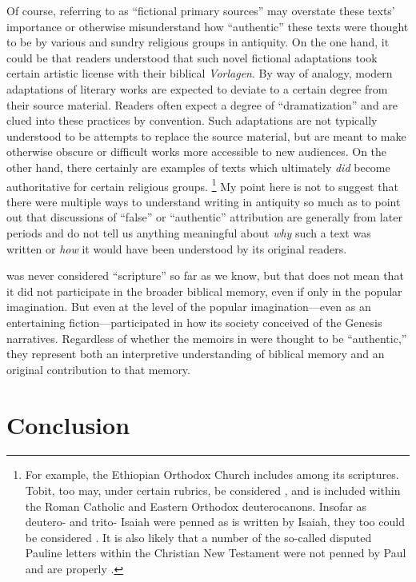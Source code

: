 Of course, referring to \psy as ``fictional primary sources'' may overstate these texts' importance or otherwise misunderstand how ``authentic'' these texts were thought to be by various and sundry religious groups in antiquity. On the one hand, it could be that readers understood that such novel fictional adaptations took certain artistic license with their biblical \emph{Vorlagen}. By way of analogy, modern adaptations of literary works are expected to deviate to a certain degree from their source material. Readers often expect a degree of ``dramatization'' and are clued into these practices by convention. Such adaptations are not typically understood to be attempts to replace the source material, but are meant to make otherwise obscure or difficult works more accessible to new audiences. On the other hand, there certainly are examples of \psgraphical texts which ultimately \emph{did} become authoritative for certain religious groups.%
    \footnote{For example, the Ethiopian Orthodox Church includes \firstenoch among its scriptures. Tobit, too may, under certain rubrics, be considered \psa, and is included within the Roman Catholic and Eastern Orthodox deuterocanons. Insofar as deutero- and trito- Isaiah were penned as is written by Isaiah, they too could be considered \psa. It is also likely that a number of the so-called disputed Pauline letters within the Christian New Testament were not penned by Paul and are properly \psgraphical.}
My point here is not to suggest that there were multiple ways to understand \psgraphical writing in antiquity so much as to point out that discussions of ``false'' or ``authentic'' attribution are generally from later periods and do not tell us anything meaningful about \emph{why} such a text was written or \emph{how} it would have been understood by its original readers.

\GA was never considered ``scripture'' so far as we know, but that does not mean that it did not participate in the broader biblical memory, even if only in the popular imagination. But even at the level of the popular imagination---even as an entertaining fiction---\ga participated in how its society conceived of the Genesis narratives. Regardless of whether the memoirs in \ga were thought to be ``authentic,'' they represent both an interpretive understanding of biblical memory and an original contribution to that memory.

\section{Conclusion}

